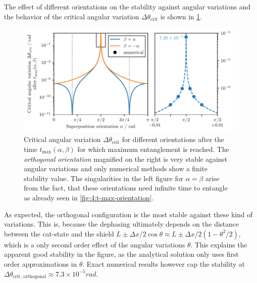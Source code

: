 The effect of different orientations on the stability against angular variations and the behavior of the critical angular variation $\Delta \theta_\mathrm{crit}$ is shown in \cref{fig:4:theta-crit-orientation}.
\begin{figure}[!htbp]
  \centering
  \includegraphics[width=\textwidth]{./../figures/theta-variance/theta-crit-orientation-complete.pdf}
  \caption{Critical angular variation $\Delta \theta_\mathrm{crit}$ for different orientations after the time $t_\mathrm{max}(\alpha, \beta)$ for which maximum entanglement is reached. The \emph{orthogonal orientation} magnified on the right is very stable against angular variations and only numerical methods show a finite stability value. The singularities in the left figure for $\alpha = \beta$ arise from the fact, that these orientations need infinite time to entangle as already seen in \cref{fig:4:t-max-orientation}.}
  \label{fig:4:theta-crit-orientation}
\end{figure}
As expected, the orthogonal configuration is the most stable against these kind of variations. This is, because the dephasing ultimately depends on the distance between the cat-state and the shield $L \pm \Delta x/2 \cos\theta \approx L \pm \Delta x/2 (1 - \theta^2/2)$, which is a only second order effect of the angular variations $\theta$.
This explains the apparent  good stability in the figure, as the analytical solution only uses first order approximations in $\theta$.
Exact numerical results however cap the stability at $\Delta \theta_\mathrm{crit,\,orthogonal} \approx 7.3\times 10^{-5}\si{rad}$.

